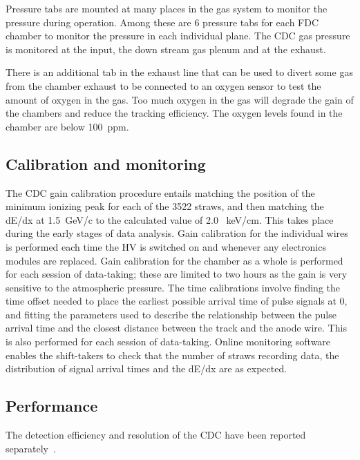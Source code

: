 Pressure tabs are mounted at many places in the gas system to monitor the pressure during operation. Among these are
6 pressure tabs for each FDC chamber to monitor the pressure in each individual plane. The CDC gas pressure is monitored
at the input, the down stream gas plenum and at the exhaust.

There is an additional tab in the exhaust line that can be used to divert some gas from the chamber exhaust to be connected
to an oxygen sensor to test the amount of oxygen in the gas. Too much oxygen in the gas will degrade the gain of
the chambers and reduce the tracking efficiency. The oxygen levels found in the chamber are below 100~ppm. 

\subsection{Calibration and monitoring \label{sec:dccalib}}
The CDC gain calibration procedure entails matching the position of the minimum ionizing peak for each of the 3522 straws, and then matching the dE/dx at 1.5~GeV/c to the calculated value of 2.0~ keV/cm. 
This takes place during the early stages of data analysis.
Gain calibration for the individual wires is performed each time the HV is switched on and whenever any electronics modules are replaced. 
Gain calibration for the chamber as a whole is performed for each session of data-taking; these are limited to two hours as the gain is very sensitive to the atmospheric pressure.
The time calibrations involve finding the time offset needed to place the earliest possible arrival time of pulse signals at 0, and fitting the parameters used to describe the relationship between the pulse arrival time and the closest distance between the track and the anode wire. This is also performed for each session of data-taking. 
Online monitoring software enables the shift-takers to check that the number of straws recording data, the distribution of signal arrival times and the dE/dx are as expected. 

\subsection{Performance\label{sec:dcperformance}}
The detection efficiency and resolution of the CDC have been  reported separately~\cite{GlueXCDCNIM}. 


